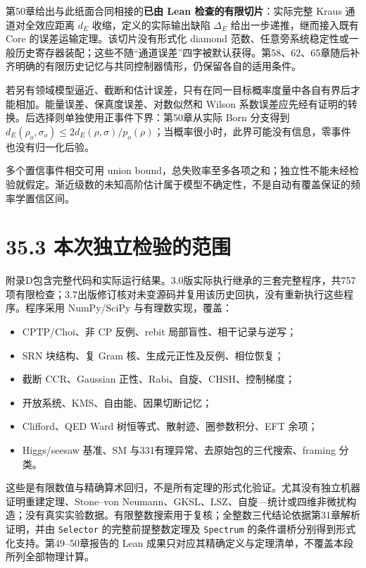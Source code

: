 \documentclass[
  11pt,
  oneside]{book}
\providecommand{\tightlist}{%
  \setlength{\itemsep}{0pt}\setlength{\parskip}{0pt}}
\begin{document}
第50章给出与此纸面合同相接的\textbf{已由 Lean 检查的有限切片}：实际完整
Kraus 通道对全效应距离 \(d_E\) 收缩，定义的实际输出缺陷 \(\Delta_E\)
给出一步递推，继而接入既有 Core 的误差运输定理。该切片没有形式化 diamond
范数、任意旁系统稳定性或一般历史寄存器装配；这些不随``通道误差''四字被默认获得。第58、62、65章随后补齐明确的有限历史记忆与共同控制器情形，仍保留各自的适用条件。

若另有领域模型逼近、截断和估计误差，只有在同一目标概率度量中各自有界后才能相加。能量误差、保真度误差、对数似然和
Wilson
系数误差应先经有证明的转换。后选择则单独使用正事件下界：第50章从实际
Born 分支得到
\(d_E(\rho_o,\sigma_o)\le2d_E(\rho,\sigma)/p_o(\rho)\)；当概率很小时，此界可能没有信息，零事件也没有归一化后验。

多个置信事件相交可用 union
bound，总失败率至多各项之和；独立性不能未经检验就假定。渐近级数的未知高阶估计属于模型不确定性，不是自动有覆盖保证的频率学置信区间。

\section{35.3 本次独立检验的范围}

附录D包含完整代码和实际运行结果。3.0版实际执行继承的三套完整程序，共757项有限检查；3.7出版修订核对未变源码并复用该历史回执，没有重新执行这些程序。程序采用
NumPy/SciPy 与有理数实现，覆盖：

\begin{itemize}
\tightlist
\item
  CPTP/Choi、非 CP 反例、rebit 局部盲性、相干记录与逆写；
\item
  SRN 块结构、复 Gram 核、生成元正性及反例、相位恢复；
\item
  截断 CCR、Gaussian 正性、Rabi、自旋、CHSH、控制梯度；
\item
  开放系统、KMS、自由能、因果切断记忆；
\item
  Clifford、QED Ward 树恒等式、散射迹、圈参数积分、EFT 余项；
\item
  Higgs/seesaw 基准、SM 与331有理异常、去原始包的三代搜索、framing
  分类。
\end{itemize}

这些是有限数值与精确算术回归，不是所有定理的形式化验证。尤其没有独立机器证明重建定理、Stone--von
Neumann、GKSL、LSZ、自旋---统计或四维非微扰构造；没有真实实验数据。有限整数搜索用于复核；全整数三代结论依据第31章解析证明，并由
\texttt{Selector} 的完整前提整数定理及 \texttt{Spectrum}
的条件谱桥分别得到形式化支持。第49--50章报告的 Lean
成果只对应其精确定义与定理清单，不覆盖本段所列全部物理计算。
\end{document}

